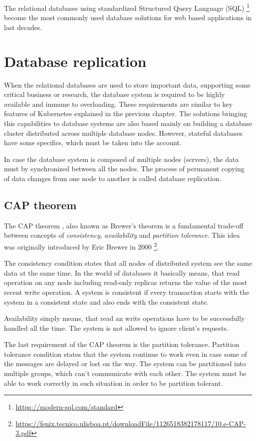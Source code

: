 \documentclass[
  digital, %
  twoside, %
  table,   %
  lof,     %
  lot,     %
]{fithesis3}
\begin{document}
The relational databases using standardized Structured Query Language (SQL) \footnote{\url{https://modern-sql.com/standard}} become the most commonly used database solutions for web based applications in last decades.

\section{Database replication} \label{sec:db_replication}
When the relational databases are used to store important data, supporting some critical business or research, the database system is required to be highly available and immune to overloading. These requirements are similar to key features of Kubernetes explained in the previous chapter. The solutions bringing this capabilities to database systems are also based mainly on building a database cluster distributed across multiple database nodes. However, stateful databases have some specifics, which must be taken into the account.

In case the database system is composed of multiple nodes (servers), the data must by synchronized between all the nodes. The process of permanent copying of data changes from one node to another is called database replication.

\subsection{CAP theorem}
The CAP theorem \cite{cap}, also known as Brewer's theorem is a fundamental trade-off between concepts of \textit{consistency}, \textit{availability} and \textit{partition tolerance}. This idea was originally introduced by Eric Brewer in 2000 \footnote{\url{https://fenix.tecnico.ulisboa.pt/downloadFile/1126518382178117/10.e-CAP-3.pdf}}.

The consistency condition states that all nodes of distributed system see the same data at the same time. In the world of databases it basically means, that read operation on any node including read-only replicas returns the value of the most recent write operation. A system is consistent if every transaction starts with the system in a consistent state and also ends with the consistent state.

Availability simply means, that read an write operations have to be successfully handled all the time. The system is not allowed to ignore client's requests.

The last requirement of the CAP theorem is the partition tolerance. Partition tolerance condition states that the system continue to work even in case some of the messages are delayed or lost on the way. The system can be partitioned into multiple groups, which can't communicate with each other. The system must be able to work correctly in such situation in order to be partition tolerant.
\end{document}

